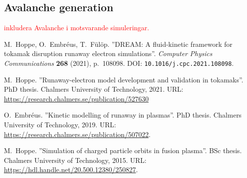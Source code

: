 \documentclass[11pt,a4paper]{article}
\begin{document}
\subsection{Avalanche generation}
\textcolor{red}{inkludera Avalanche i motsvarande simuleringar.}

\begin{thebibliography}{100}
    M.\ Hoppe, O.\ Embréus, T.\ Fülöp. ''DREAM: A fluid-kinetic framework for tokamak disruption runaway electron simulations''. \textit{Computer Physics Communications} \textbf{268} (2021), p.\ 108098. DOI: \texttt{10.1016/j.cpc.2021.108098}.

    M.\ Hoppe. ''Runaway-electron model development and validation in tokamaks''. PhD thesis. Chalmers University of Technology, 2021. URL: \url{https://research.chalmers.se/publication/527630}

    O.\ Embréus. ''Kinetic modelling of runaway in plasmas''. PhD thesis. Chalmers University of Technology, 2019. URL: \url{https://research.chalmers.se/publication/507022}.

    M.\ Hoppe. ''Simulation of charged particle orbits in fusion plasma''. BSc thesis. Chalmers University of Technology, 2015. URL: \url{https://hdl.handle.net/20.500.12380/250827}.

\end{thebibliography}
\end{document}
